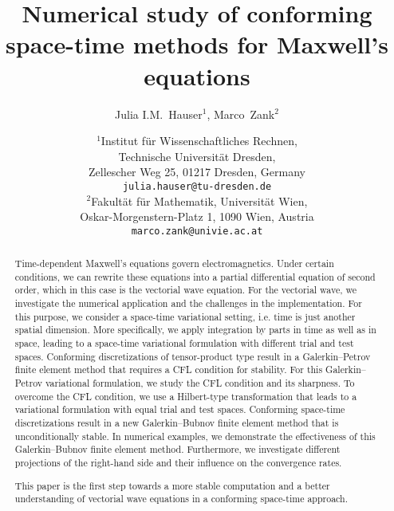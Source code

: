 \documentclass[a4paper,11pt]{article}
\begin{document}
\title{Numerical study of conforming space-time methods for Maxwell's equations}
\author{Julia I.M.~Hauser$^1$, Marco~Zank$^2$}
\date{
	$^1$Institut für Wissenschaftliches Rechnen, \\
	Technische Universität Dresden, \\
	Zellescher Weg 25, 01217 Dresden, Germany \\[1mm]
	{\tt julia.hauser@tu-dresden.de}  \\[3mm]
	$^2$Fakult\"at f\"ur Mathematik, Universit\"at Wien, \\
	Oskar-Morgenstern-Platz 1, 1090 Wien, Austria \\[1mm]
	{\tt marco.zank@univie.ac.at}
}

\maketitle

\begin{abstract}
  Time-dependent Maxwell's equations govern electromagnetics. Under certain conditions, we can rewrite these equations into a partial differential equation of second order, which in this case is the vectorial wave equation. For the vectorial wave, we investigate the numerical application and the challenges in the implementation. For this purpose, we consider a space-time variational setting, i.e. time is just another spatial dimension. More specifically, we apply integration by parts in time as well as in space, leading to a space-time variational formulation with different trial and test spaces. Conforming discretizations of tensor-product type result in a Galerkin--Petrov finite element method that requires a CFL condition for stability. For this Galerkin--Petrov variational formulation, we study the CFL condition and its sharpness. To overcome the CFL condition, we use a Hilbert-type transformation that leads to a variational formulation with equal trial and test spaces. Conforming space-time discretizations result in a new Galerkin--Bubnov finite element method that is unconditionally stable. In numerical examples, we demonstrate the effectiveness of this Galerkin--Bubnov finite element method. Furthermore, we investigate different projections of the right-hand side and their influence on the convergence rates.
      
  This paper is the first step towards a more stable computation and a better understanding of vectorial wave equations in a conforming space-time approach.
\end{abstract}
\end{document}
